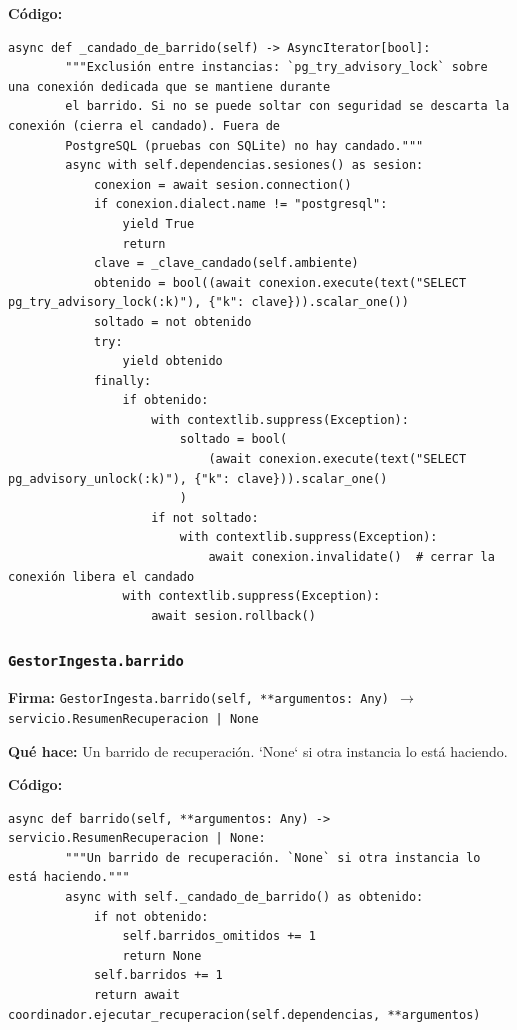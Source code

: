 \documentclass[11pt,a4paper]{article}
\begin{document}
\textbf{Código:}
\begin{lstlisting}
async def _candado_de_barrido(self) -> AsyncIterator[bool]:
        """Exclusión entre instancias: `pg_try_advisory_lock` sobre una conexión dedicada que se mantiene durante
        el barrido. Si no se puede soltar con seguridad se descarta la conexión (cierra el candado). Fuera de
        PostgreSQL (pruebas con SQLite) no hay candado."""
        async with self.dependencias.sesiones() as sesion:
            conexion = await sesion.connection()
            if conexion.dialect.name != "postgresql":
                yield True
                return
            clave = _clave_candado(self.ambiente)
            obtenido = bool((await conexion.execute(text("SELECT pg_try_advisory_lock(:k)"), {"k": clave})).scalar_one())
            soltado = not obtenido
            try:
                yield obtenido
            finally:
                if obtenido:
                    with contextlib.suppress(Exception):
                        soltado = bool(
                            (await conexion.execute(text("SELECT pg_advisory_unlock(:k)"), {"k": clave})).scalar_one()
                        )
                    if not soltado:
                        with contextlib.suppress(Exception):
                            await conexion.invalidate()  # cerrar la conexión libera el candado
                with contextlib.suppress(Exception):
                    await sesion.rollback()
\end{lstlisting}

\subsubsection*{\texttt{GestorIngesta.barrido}}
\textbf{Firma:} \texttt{GestorIngesta.barrido(self, **argumentos: Any) $\rightarrow$ servicio.ResumenRecuperacion | None}

\textbf{Qué hace:} Un barrido de recuperación. `None` si otra instancia lo está haciendo.

\textbf{Código:}
\begin{lstlisting}
async def barrido(self, **argumentos: Any) -> servicio.ResumenRecuperacion | None:
        """Un barrido de recuperación. `None` si otra instancia lo está haciendo."""
        async with self._candado_de_barrido() as obtenido:
            if not obtenido:
                self.barridos_omitidos += 1
                return None
            self.barridos += 1
            return await coordinador.ejecutar_recuperacion(self.dependencias, **argumentos)
\end{lstlisting}
\end{document}
